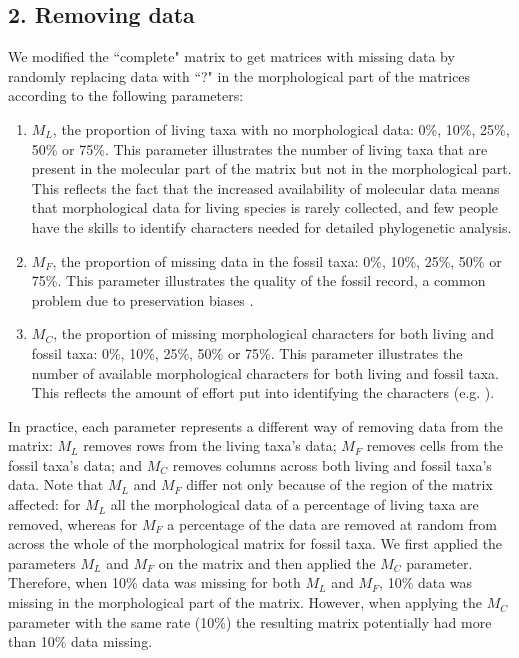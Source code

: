 \documentclass[10pt,letterpaper]{article}
\begin{document}
\subsection*{2. Removing data}
\label{Removing_data}
We modified the ``complete" matrix to get matrices with missing data by randomly replacing data with ``?" in the morphological part of the matrices according to the following parameters:
\begin{enumerate}
\item{$M_{L}$, the proportion of living taxa with no morphological data: 0\%, 10\%, 25\%, 50\% or 75\%.}
This parameter illustrates the number of living taxa that are present in the molecular part of the matrix but not in the morphological part. This reflects the fact that the increased availability of molecular data means that morphological data for living species is rarely collected, and few people have the skills to identify characters needed for detailed phylogenetic analysis.
\item{$M_{F}$, the proportion of missing data in the fossil taxa: 0\%, 10\%, 25\%, 50\% or 75\%.}
This parameter illustrates the quality of the fossil record, a common problem due to preservation biases \cite{sansomfossilization2013}. 
\item{$M_{C}$, the proportion of missing morphological characters for both living and fossil taxa: 0\%, 10\%, 25\%, 50\% or 75\%. }
This parameter illustrates the number of available morphological characters for both living and fossil taxa. This reflects the amount of effort put into identifying the characters (e.g. \cite{O'Leary08022013}).
\end{enumerate}

In practice, each parameter represents a different way of removing data from the matrix: $M_L$ removes rows from the living taxa's data; $M_F$ removes cells from the fossil taxa's data; and $M_C$ removes columns across both living and fossil taxa's data. Note that $M_L$ and $M_F$ differ not only because of the region of the matrix affected: for $M_L$ all the morphological data of a percentage of living taxa are removed, whereas for $M_F$ a percentage of the data are removed at random from across the whole of the morphological matrix for fossil taxa. We first applied the parameters $M_L$ and $M_F$ on the matrix and then applied the $M_C$ parameter. Therefore, when 10\% data was missing for both $M_L$ and $M_F$, 10\% data was missing in the morphological part of the matrix. However, when applying the $M_C$ parameter with the same rate (10\%) the resulting matrix potentially had more than 10\% data missing.
\end{document}

